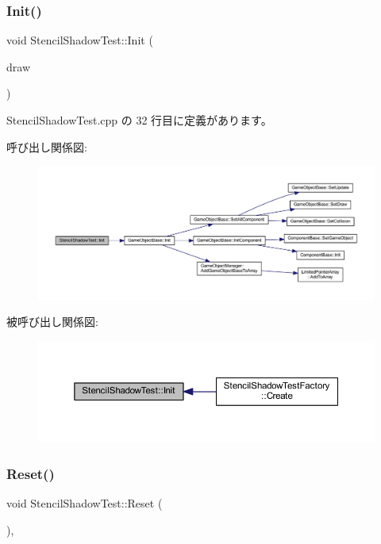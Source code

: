 \subsubsection{\texorpdfstring{Init()}{Init()}}
{\footnotesize\ttfamily void Stencil\+Shadow\+Test\+::\+Init (\begin{DoxyParamCaption}\item[{\mbox{\hyperlink{class_draw_base}{Draw\+Base}} $\ast$}]{draw }\end{DoxyParamCaption})}



 Stencil\+Shadow\+Test.\+cpp の 32 行目に定義があります。

呼び出し関係図\+:\nopagebreak
\begin{figure}[H]
\begin{center}
\leavevmode
\includegraphics[width=350pt]{class_stencil_shadow_test_a4a58695fafd134d750eb23ee5ec2bdb6_cgraph}
\end{center}
\end{figure}
被呼び出し関係図\+:\nopagebreak
\begin{figure}[H]
\begin{center}
\leavevmode
\includegraphics[width=350pt]{class_stencil_shadow_test_a4a58695fafd134d750eb23ee5ec2bdb6_icgraph}
\end{center}
\end{figure}
\mbox{\label{class_stencil_shadow_test_a7691120143c64b99d6c8f5391be56e83}} 
\subsubsection{\texorpdfstring{Reset()}{Reset()}}
{\footnotesize\ttfamily void Stencil\+Shadow\+Test\+::\+Reset (\begin{DoxyParamCaption}{ }\end{DoxyParamCaption})\hspace{0.3cm}{\ttfamily [override]}, {\ttfamily [virtual]}}



